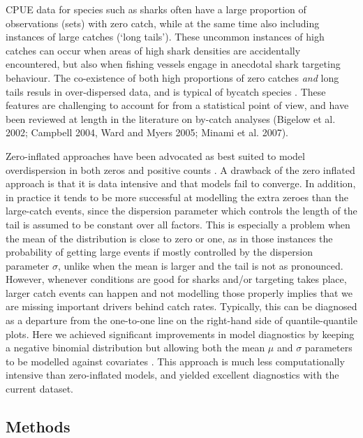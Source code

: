CPUE data for species such as sharks often have a large proportion of observations (sets) with zero catch, while at the same time also including instances of large catches (`long tails'). These uncommon instances of high catches can occur when areas of high shark densities are accidentally encountered, but also when fishing vessels engage in anecdotal shark targeting behaviour. The co-existence of both high proportions of zero catches \emph{and} long tails resuls in over-dispersed data, and is typical of bycatch species \citep{Ward2005_a}. These features are challenging to account for from a statistical point of view, and have been reviewed at length in the literature on by-catch analyses (Bigelow et al.  2002; Campbell  2004, Ward and Myers  2005; Minami et al. 2007).

Zero-inflated approaches have been advocated as best suited to model overdispersion in both zeros and positive counts \citep{Brodziak_2013_a}. A drawback of the zero inflated approach is that it is data intensive and that models fail to converge. In addition, in practice it tends to be more successful at modelling the extra zeroes than the large-catch events, since the dispersion parameter which controls the length of the tail is assumed to be constant over all factors. This is especially a problem when the mean of the distribution is close to zero or one, as in those instances the probability of getting large events if mostly controlled by the dispersion parameter $\sigma$, unlike when the mean is larger and the tail is not as pronounced. However, whenever conditions are good for sharks and/or targeting takes place, larger catch events can happen and not modelling those properly implies that we are missing important drivers behind catch rates. Typically, this can be diagnosed as a departure from the one-to-one line on the right-hand side of quantile-quantile plots. Here we achieved significant improvements in model diagnostics by keeping a negative binomial distribution but allowing both the mean $\mu$ and $\sigma$ parameters to be modelled against covariates \citep{GAMLSSXXXX}. This approach is much less computationally intensive than zero-inflated models, and yielded excellent diagnostics with the current dataset.


 \subsection{Methods}
 \label{cpuemeth:datafilter}
